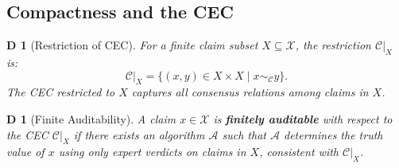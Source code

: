 \documentclass[12pt,a4paper]{article}
\newtheorem{definition}[theorem]Definition
\theoremstyle{remark}
\newcommand{\CEC}{\mathcal{C}}
\newcommand{\ClaimSpace}{\mathcal{X}}
\begin{document}
\subsection{Compactness and the CEC}
\begin{definition}[Restriction of CEC]
For a finite claim subset \(X \subseteq \ClaimSpace\), the restriction \(\CEC|_X\) is:
\begin{equation}
    \CEC|_X = \{(x,y) \in X \times X \mid x \sim_{\CEC} y\}.
\end{equation}
The CEC restricted to \(X\) captures all consensus relations among claims in \(X\).
\end{definition}

\begin{definition}[Finite Auditability]
A claim \(x \in \ClaimSpace\) is \textbf{finitely auditable} with respect to the CEC \(\CEC|_X\) if there exists an algorithm \(\mathcal{A}\) such that \(\mathcal{A}\) determines the truth value of \(x\) using only expert verdicts on claims in \(X\), consistent with \(\CEC|_X\).
\end{definition}
\end{document}
